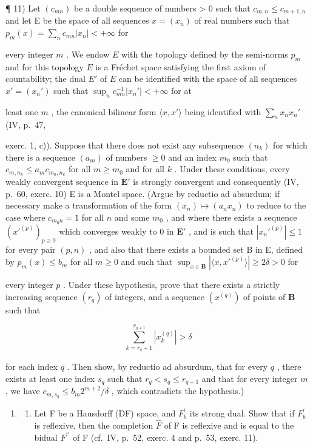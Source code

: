 ¶ 11) Let \((c_{mn})\) be a double sequence of numbers \textgreater{} 0 such that \(c_{m,n} \leqslant c_{m+1,n}\) and let E be the space of all sequences \(x = (x_n)\) of real numbers such that \(p_m(x) = \sum_n c_{mn} |x_n| < +\infty\) for

every integer \(m\) . We endow \(E\) with the topology defined by the semi-norms \(p_m\) and for this topology \(E\) is a Fréchet space satisfying the first axiom of countability; the dual \(E'\) of \(E\) can be identified with the space of all sequences \(x' = (x_n')\) such that \(\sup_{n} c_{mn}^{-1} |x_n'| < +\infty\) for at

least one \(m\) , the canonical bilinear form \(\langle x, x' \rangle\) being identified with \(\sum_{n} x_n x_n'\) (IV, p.~47,

exerc. 1, c)). Suppose that there does not exist any subsequence \((n_k)\) for which there is a sequence \((a_m)\) of numbers \(\geqslant 0\) and an index \(m_0\) such that \(c_{m,n_k} \leqslant a_m c_{m_0,n_k}\) for all \(m \geqslant m_0\) and for all \(k\) . Under these conditions, every weakly convergent sequence in \(\mathbf{E}'\) is strongly convergent and consequently (IV, p.~60, exerc. 10) E is a Montel space. (Argue by reductio ad absurdum; if necessary make a transformation of the form \((x_n) \mapsto (a_n x_n)\) to reduce to the case where \(c_{m_0 n} = 1\) for all \(n\) and some \(m_0\) , and where there exists a sequence \((x'^{(p)})_{p \geqslant 0}\) which converges weakly to 0 in \(\mathbf{E}'\) , and is such that \(|x_n'^{(p)}| \leqslant 1\) for every pair \((p, n)\) , and also that there exists a bounded set B in E, defined by \(p_m(x) \leqslant b_m\) for all \(m \geqslant 0\) and such that \(\sup_{x \in \mathbf{B}} |\langle x, x'^{(p)} \rangle| \geqslant 2\delta > 0\) for

every integer \(p\) . Under these hypothesis, prove that there exists a strictly increasing sequence \((r_q)\) of integers, and a sequence \((x^{(q)})\) of points of \(\mathbf{B}\) such that

\[
\sum_ {k = r _ {q} + 1} ^ {r _ {q+1}} \left| x _ {k} ^ {(q)} \right| > \delta
\]

for each index \(q\) . Then show, by reductio ad absurdum, that for every \(q\) , there exists at least one index \(s_q\) such that \(r_q < s_q \leqslant r_{q+1}\) and that for every integer \(m\) , we have \(c_{m,s_q} \leqslant b_m 2^{m+2}/\delta\) , which contradicts the hypothesis.)

\begin{enumerate}
\def\labelenumi{\arabic{enumi})}
\setcounter{enumi}{11}
\tightlist
\item
  \begin{enumerate}
  \def\labelenumii{\alph{enumii})}
  \tightlist
  \item
    Let F be a Hausdorff (DF) space, and \(F_{b}^{\prime}\) its strong dual. Show that if \(F_{b}^{\prime}\) is reflexive, then the completion \(\hat{F}\) of F is reflexive and is equal to the bidual \(F^{\prime\prime}\) of F (cf.~IV, p.~52, exerc. 4 and p.~53, exerc. 11).
  \end{enumerate}
\end{enumerate}

